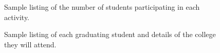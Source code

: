 \begin{figure}[h!]
	\centering
	\caption{Sample listing of the number of students participating in each activity.}
	\label{fig:screens-analytics-activities}
\end{figure}

\begin{figure}[h!]
	\centering
	\caption{Sample listing of each graduating student and details of the college they will attend.}
	\label{fig:screens-analytics-graduates}
\end{figure}
